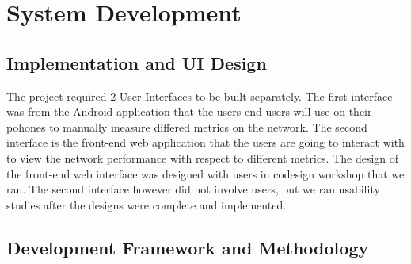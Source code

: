 \section{System Development}\label{sec:system-development}
\subsection{Implementation and UI Design}\label{subsec:implementation-and-ui-design}
The project required 2 User Interfaces to be built separately.
The first interface was from the Android application that the users end users will use on their pohones to manually measure differed metrics on the network.
The second interface is the front-end web application that the users are going to interact with to view the network performance with respect to different metrics.
The design of the front-end web interface was designed with users in codesign workshop that we ran.
The second interface however did not involve users, but we ran usability studies after the designs were complete and implemented.
\subsection{Development Framework and Methodology}\label{subsec:development-framework-and-methodology}
